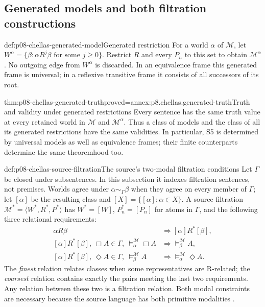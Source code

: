 \subsection{Generated models and both filtration constructions}

\begin{hbdefinition}{def:p08-chellas-generated-model}{Generated restriction}
For a world \(\alpha\) of \(\mathcal M\), let
\(W^\alpha=\{\beta:\alpha R^j\beta\text{ for some }j\geq0\}\).
Restrict \(R\) and every \(P_n\) to this set to obtain
\(\mathcal M^\alpha\). No outgoing edge from \(W^\alpha\) is
discarded. In an equivalence frame this generated frame is universal;
in a reflexive transitive frame it consists of all successors of its root.
\end{hbdefinition}

\begin{hblemma}{thm:p08-chellas-generated-truth}{proved=annex:p8.chellas.generated-truth}{Truth and validity under generated restrictions}
Every sentence has the same truth value at every retained world in
\(\mathcal M\) and \(\mathcal M^\alpha\). Thus a class of models
and the class of all its generated restrictions have the same validities.
In particular, S5 is determined by universal models as well as equivalence
frames; their finite counterparts determine the same theoremhood too.
\end{hblemma}

\begin{hbdefinition}{def:p08-chellas-source-filtration}{The source's two-modal filtration conditions}
Let \(\Gamma\) be closed under subsentences. In this subsection it
indexes filtration sentences, not premises. Worlds agree under
\(\alpha\sim_\Gamma\beta\) when they agree on every member of
\(\Gamma\); let \([\alpha]\) be the resulting class and
\([X]=\{[\alpha]:\alpha\in X\}\).
A source filtration \(\mathcal M^*=\langle W^*,R^*,P^*\rangle\)
has \(W^*=[W]\), \(P_n^*=[P_n]\) for atoms in \(\Gamma\), and
the following three relational requirements:
\[
\begin{aligned}
 \alpha R\beta&\Rightarrow[\alpha]R^*[\beta],\\
 [\alpha]R^*[\beta],\ \Box A\in\Gamma,\
       \models_\alpha^{\mathcal M}\Box A
       &\Rightarrow\models_\beta^{\mathcal M}A,\\
 [\alpha]R^*[\beta],\ \Diamond A\in\Gamma,\
       \models_\beta^{\mathcal M}A
       &\Rightarrow\models_\alpha^{\mathcal M}\Diamond A.
\end{aligned}
\]
The \emph{finest} relation relates classes when some representatives are
R-related; the \emph{coarsest} relation contains exactly the pairs
meeting the last two requirements. Any relation between these two is
a filtration relation. Both modal constraints are necessary because
the source language has both primitive modalities
\cite[def.~3.14, \S3.5]{Chellas1980}.
\end{hbdefinition}

